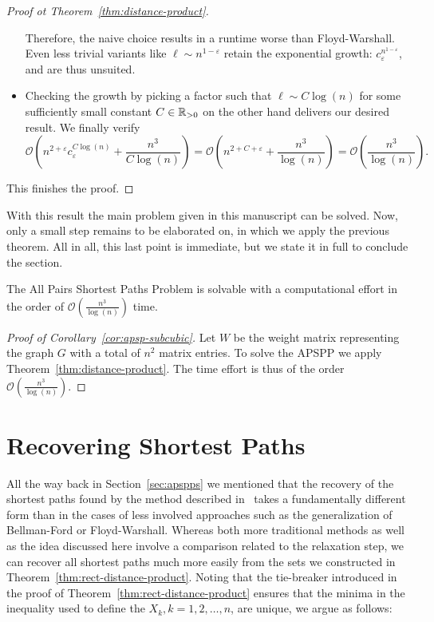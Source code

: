 \begin{proof}[Proof ot Theorem~\ref{thm:distance-product}]
\begin{itemize}
            Therefore, the naive choice results in a runtime worse than Floyd-Warshall.
            Even less trivial variants like $\ell \sim n^{1 - \varepsilon}$ retain the exponential growth: $c_\varepsilon^{n^{1 - \varepsilon}}$, and are thus unsuited.
        \item %
            Checking the growth by picking a factor such that $\ell \sim C \log(n)$ for some sufficiently small constant $C \in \mathbb{R}_{> 0}$ on the other hand delivers our desired result.
            We finally verify
            \[
                \mathcal{O}\left( n^{2 + \varepsilon} c_\varepsilon^{C \log(n)} + \frac{n^3}{C \log(n)} \right) = \mathcal{O}\left( n^{2 + C + \varepsilon} + \frac{n^3}{\log(n)} \right) = \mathcal{O}\left( \frac{n^3}{\log(n)} \right).
            \]
    \end{itemize}
    This finishes the proof.
\end{proof}

With this result the main problem given in this manuscript can be solved.
Now, only a small step remains to be elaborated on, in which we apply the previous theorem.
All in all, this last point is immediate, but we state it in full to conclude the section.

\begin{corollary}\label{cor:apsp-subcubic}
    The All Pairs Shortest Paths Problem is solvable with a computational effort in the order of $\mathcal{O}\left( \frac{n^3}{\log(n)} \right)$ time.
\end{corollary}

\begin{proof}[Proof of Corollary~\ref{cor:apsp-subcubic}]
    Let $W$ be the weight matrix representing the graph $G$ with a total of $n^2$ matrix entries.
    To solve the APSPP we apply Theorem~\ref{thm:distance-product}.
    The time effort is thus of the order $\mathcal{O}\left( \frac{n^3}{\log(n)} \right)$.
\end{proof}

\section{Recovering Shortest Paths}\label{sec:recovery}

All the way back in Section~\ref{sec:apspps} we mentioned that the recovery of the shortest paths found by the method described in~\cite{Chan2007} takes a fundamentally different form than in the cases of less involved approaches such as the generalization of Bellman-Ford or Floyd-Warshall.
Whereas both more traditional methods as well as the idea discussed here involve a comparison related to the relaxation step, we can recover all shortest paths much more easily from the sets we constructed in Theorem~\ref{thm:rect-distance-product}.
Noting that the tie-breaker introduced in the proof of Theorem~\ref{thm:rect-distance-product} ensures that the minima in the inequality used to define the $X_k, k = 1, 2, \dots, n$, are unique, we argue as follows:

